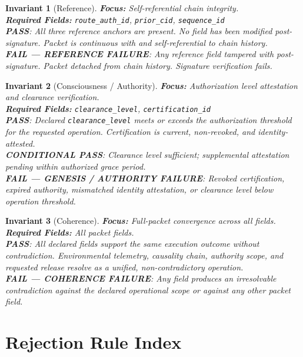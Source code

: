 \documentclass[11pt]{article}
\theoremstyle{invariantstyle}
\newtheorem{invariant}{Invariant}
\theoremstyle{defstyle}
\newcommand{\PASS}{\textcolor{passgreen}{\textbf{PASS}}}
\newcommand{\CPASS}{\textcolor{condyellow}{\textbf{CONDITIONAL PASS}}}
\newcommand{\FAIL}[1]{\textcolor{failred}{\textbf{FAIL — #1}}}
\begin{document}
\begin{invariant}[Reference]
\textbf{Focus:} Self-referential chain integrity.\\
\textbf{Required Fields:} \texttt{route\_auth\_id}, \texttt{prior\_cid},
\texttt{sequence\_id}\\[4pt]
\PASS: All three reference anchors are present. No field has been
modified post-signature. Packet is continuous with and self-referential
to chain history.\\[2pt]
\FAIL{REFERENCE FAILURE}: Any reference field tampered with
post-signature. Packet detached from chain history. Signature
verification fails.
\end{invariant}

\begin{invariant}[Consciousness / Authority]
\textbf{Focus:} Authorization level attestation and clearance verification.\\
\textbf{Required Fields:} \texttt{clearance\_level}, \texttt{certification\_id}\\[4pt]
\PASS: Declared \texttt{clearance\_level} meets or exceeds the
authorization threshold for the requested operation. Certification
is current, non-revoked, and identity-attested.\\[2pt]
\CPASS: Clearance level sufficient; supplemental attestation pending
within authorized grace period.\\[2pt]
\FAIL{GENESIS / AUTHORITY FAILURE}: Revoked certification, expired
authority, mismatched identity attestation, or clearance level
below operation threshold.
\end{invariant}

\begin{invariant}[Coherence]
\textbf{Focus:} Full-packet convergence across all fields.\\
\textbf{Required Fields:} All packet fields.\\[4pt]
\PASS: All declared fields support the same execution outcome
without contradiction. Environmental telemetry, causality chain,
authority scope, and requested release resolve as a unified,
non-contradictory operation.\\[2pt]
\FAIL{COHERENCE FAILURE}: Any field produces an irresolvable
contradiction against the declared operational scope or against
any other packet field.
\end{invariant}

\section{Rejection Rule Index}
\end{document}
